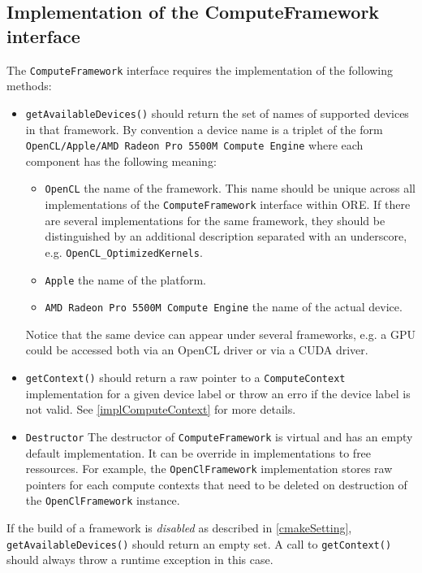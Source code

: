 \documentclass[12pt, a4paper]{article}
\begin{document}
\subsection{Implementation of the ComputeFramework interface}\label{implComputeFramework}

The \verb+ComputeFramework+ interface requires the implementation of the following methods:

\begin{itemize}
\item \verb+getAvailableDevices()+ should return the set of names of supported devices in that framework. By convention
  a device name is a triplet of the form \verb+OpenCL/Apple/AMD Radeon Pro 5500M Compute Engine+ where each component
  has the following meaning:
  \begin{itemize}
    \item \verb+OpenCL+ the name of the framework. This name should be unique across all implementations of the
      \verb+ComputeFramework+ interface within ORE. If there are several implementations for the same framework, they
      should be distinguished by an additional description separated with an underscore,
      e.g. \verb+OpenCL_OptimizedKernels+.
    \item \verb+Apple+ the name of the platform.
    \item \verb+AMD Radeon Pro 5500M Compute Engine+ the name of the actual device.
  \end{itemize}
  Notice that the same device can appear under several frameworks, e.g. a GPU could be accessed both via an OpenCL
  driver or via a CUDA driver.
\item \verb+getContext()+ should return a raw pointer to a \verb+ComputeContext+ implementation for a given device label
  or throw an erro if the device label is not valid. See \ref{implComputeContext} for more details.
\item \verb+Destructor+ The destructor of \verb+ComputeFramework+ is virtual and has an empty default implementation. It
  can be override in implementations to free ressources. For example, the \verb+OpenClFramework+ implementation stores
  raw pointers for each compute contexts that need to be deleted on destruction of the \verb+OpenClFramework+ instance.
\end{itemize}

If the build of a framework is {\em disabled} as described in \ref{cmakeSetting}, \verb+getAvailableDevices()+ should
return an empty set. A call to \verb+getContext()+ should always throw a runtime exception in this case.
\end{document}
